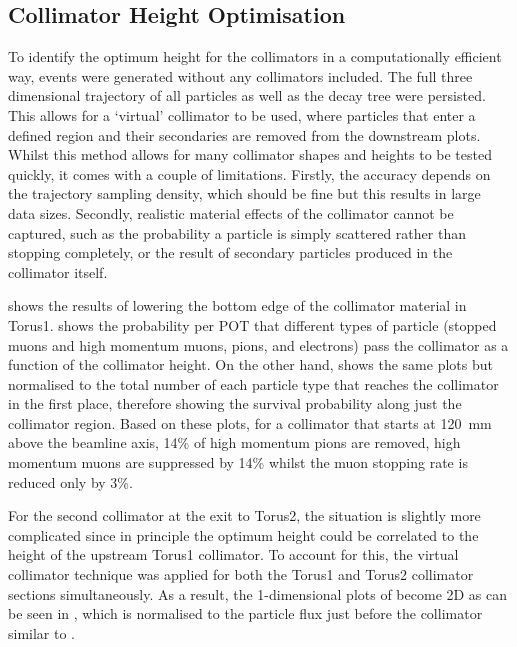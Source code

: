 \subsection{Collimator Height Optimisation}
\FigOptimMuBeamCollimTorusOne
To identify the optimum height for the collimators in a computationally efficient way, events were generated without any collimators included.
The full three dimensional trajectory of all particles as well as the decay tree were persisted.
This allows for a `virtual' collimator to be used, where particles that enter a defined region and their secondaries are removed from the downstream plots.
Whilst this method allows for many collimator shapes and heights to be tested quickly, it comes with a couple of limitations.
Firstly, the accuracy depends on the trajectory sampling density, which should be fine but this results in large data sizes.
Secondly, realistic material effects of the collimator cannot be captured, such as the probability a particle is simply scattered rather than stopping completely, or the result of secondary particles produced in the collimator itself.
\FigOptimMuBeamCollimTorusTwoFraction
\FigOptimMuBeamCollimTorusTwoContours
\FigOptimMuBeamCollimMuonPathsWColl

 shows the results of lowering the bottom edge of the collimator material in Torus1.
 shows the probability per \ac{POT} that different types of particle (stopped muons and high momentum muons, pions, and electrons) pass the collimator as a function of the collimator height.
On the other hand,  shows the same plots but normalised to the total number of each particle type that reaches the collimator in the first place, therefore showing the survival probability along just the collimator region.
Based on these plots, for a collimator that starts at 120~mm above the beamline axis, 14\% of high momentum pions are removed, high momentum muons are suppressed by 14\% whilst the muon stopping rate is reduced only by 3\%.

For the second collimator at the exit to Torus2, the situation is slightly more complicated since in principle the optimum height could be correlated to the height of the upstream Torus1 collimator.
To account for this, the virtual collimator technique was applied for both the Torus1 and Torus2 collimator sections simultaneously.
As a result, the 1-dimensional plots of  become 2D as can be seen in 
, which is normalised to the particle flux just before the collimator similar to .

